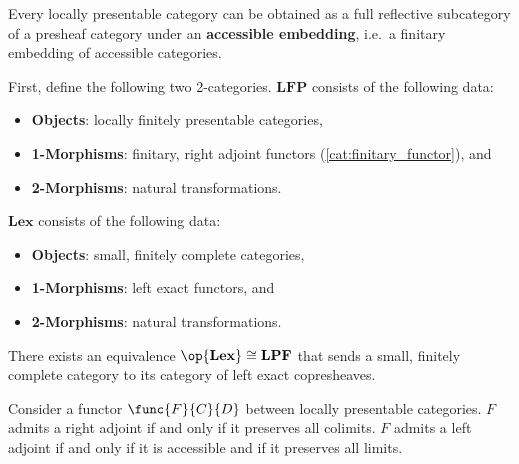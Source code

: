     \begin{property}
        Every locally presentable category can be obtained as a full reflective subcategory of a presheaf category under an \textbf{accessible embedding}, i.e.~a finitary embedding of accessible categories.
    \end{property}
    \begin{property}
        First, define the following two 2-categories. $\mathbf{LFP}$ consists of the following data:
        \begin{itemize}
            \item\textbf{Objects}: locally finitely presentable categories,
            \item\textbf{1-Morphisms}: finitary, right adjoint functors (\cref{cat:finitary_functor}), and
            \item\textbf{2-Morphisms}: natural transformations.
        \end{itemize}
        $\mathbf{Lex}$ consists of the following data:
        \begin{itemize}
            \item\textbf{Objects}: small, finitely complete categories,
            \item\textbf{1-Morphisms}: left exact functors, and
            \item\textbf{2-Morphisms}: natural transformations.
        \end{itemize}
        There exists an equivalence $\op{\mathbf{Lex}}\cong\mathbf{LPF}$ that sends a small, finitely complete category to its category of left exact copresheaves.
    \end{property}

    \begin{theorem}
        Consider a functor $\func{F}{C}{D}$ between locally presentable categories. $F$ admits a right adjoint if and only if it preserves all colimits. $F$ admits a left adjoint if and only if it is accessible and if it preserves all limits.
    \end{theorem}

